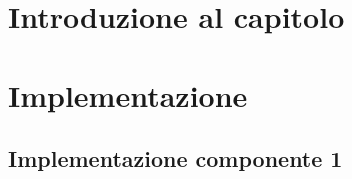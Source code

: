 \section{Introduzione al capitolo}

%
%
%
%
%
%
%

\section{Implementazione}


\subsection{Implementazione componente 1}


